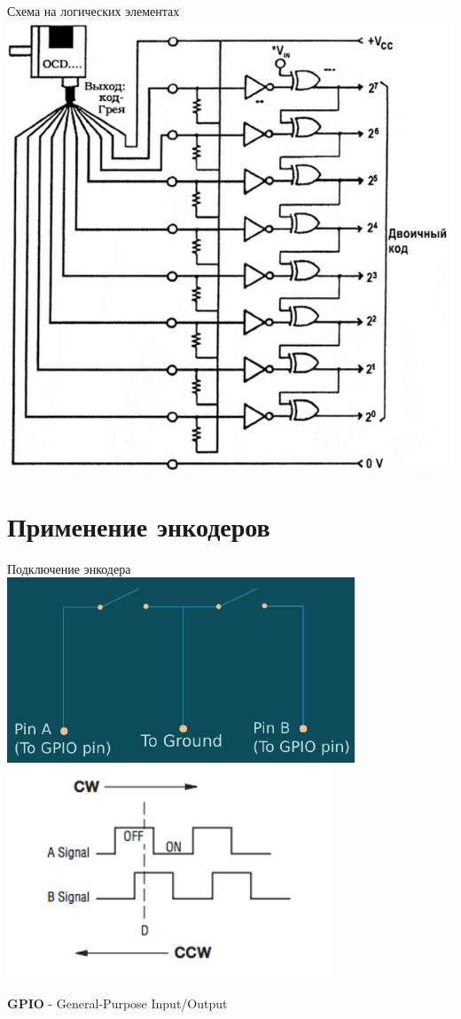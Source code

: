 \begin{frame}{Схема на логических элементах}
    \centering
    \includegraphics[height=.8\textheight]{../Figures/complexchanger.png}
\end{frame}

\section{Применение энкодеров}

\begin{frame}{Подключение энкодера}
    \centering
    \includegraphics[width=.5\linewidth]{../Figures/pins.png}
    \includegraphics[width=.5\linewidth]{../Figures/signals.png}

    \textbf{GPIO} - General-Purpose Input/Output
\end{frame}

